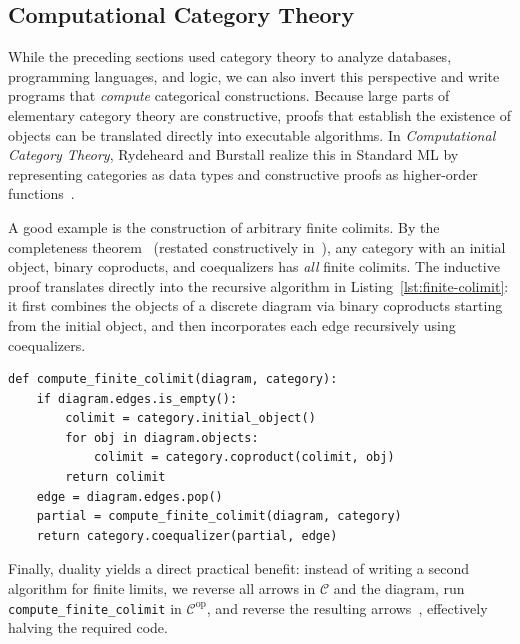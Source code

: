 \subsection{Computational Category Theory}
\label{sec:comp-ct}

While the preceding sections used category theory to analyze databases, programming languages, and logic, we can also invert this perspective and write programs that \emph{compute} categorical constructions. Because large parts of elementary category theory are constructive, proofs that establish the existence of objects can be translated directly into executable algorithms. In \emph{Computational Category Theory}, Rydeheard and Burstall realize this in Standard ML by representing categories as data types and constructive proofs as higher-order functions~\cite[Ch.~1, Sec.~3.3]{RydeheardBurstall88}.

A good example is the construction of arbitrary finite colimits. By the completeness theorem~\cite[Thm.~5.23]{Awodey10} (restated constructively in~\cite[Sec.~4.5]{RydeheardBurstall88}), any category with an initial object, binary coproducts, and coequalizers has \emph{all} finite colimits. The inductive proof translates directly into the recursive algorithm in Listing~\ref{lst:finite-colimit}: it first combines the objects of a discrete diagram via binary coproducts starting from the initial object, and then incorporates each edge recursively using coequalizers.

\lstset{language=Python, captionpos=b, basicstyle=\ttfamily\small, keywordstyle=\bfseries}
\begin{lstlisting}[caption={Recursive computation of finite colimits (adapted from~\cite{RydeheardBurstall88}).}, label=lst:finite-colimit, float=tb]
def compute_finite_colimit(diagram, category):
    if diagram.edges.is_empty():
        colimit = category.initial_object()
        for obj in diagram.objects:
            colimit = category.coproduct(colimit, obj)
        return colimit
    edge = diagram.edges.pop()
    partial = compute_finite_colimit(diagram, category)
    return category.coequalizer(partial, edge)
\end{lstlisting}

Finally, duality yields a direct practical benefit: instead of writing a second algorithm for finite limits, we reverse all arrows in $\mathcal{C}$ and the diagram, run \texttt{compute\_finite\_colimit} in $\mathcal{C}^{\mathrm{op}}$, and reverse the resulting arrows~\cite[Sec.~3.6, 4.8]{RydeheardBurstall88}, effectively halving the required code.

